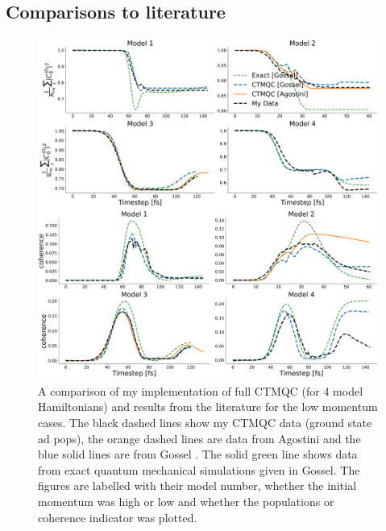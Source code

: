 \subsection{Comparisons to literature}
\begin{figure}[ht]
	\includegraphics[width=\textwidth]{../img/CTMQC/TullyModels/CTMQC_lowMom.png}
	\caption{\label{fig:LitCompCTMQCTullyLow}A comparison of my implementation of full CTMQC (for 4 model Hamiltonians) and results from the literature for the low momentum cases. The black dashed lines show my CTMQC data (ground state ad pops), the orange dashed lines are data from Agostini \cite{agostini_quantum-classical_2016} and the blue solid lines are from Gossel \cite{gossel_coupled-trajectory_2018}. The solid green line shows data from exact quantum mechanical simulations given in Gossel. The figures are labelled with their model number, whether the initial momentum was high or low and whether the populations or coherence indicator was plotted.}
\end{figure}
